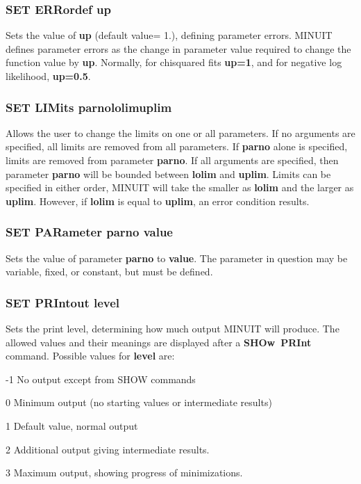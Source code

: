 \subsubsection*{SET ERRordef  up}

Sets the value of {\bf up} (default value= 1.), defining parameter errors.
MINUIT defines parameter errors as the change in parameter value
required to change the function value by {\bf up}.
Normally, for chisquared fits {\bf up=1},
and for negative log likelihood, {\bf up=0.5}.

\subsubsection*{SET LIMits  \lsb parno\rsb   \lsb lolim\rsb   \lsb uplim\rsb }

Allows the user to change the limits on one or all parameters.
If no arguments are specified, all limits are removed from all parameters.
If {\bf \lsb parno\rsb } alone is specified,
limits are removed from parameter {\bf \lsb parno\rsb }.
If all arguments are specified, then parameter
{\bf \lsb parno\rsb } will be bounded
between {\bf \lsb lolim\rsb } and {\bf \lsb uplim\rsb }.
Limits can be specified in either order,
MINUIT will take the smaller as {\bf \lsb lolim\rsb }
and the larger as {\bf \lsb uplim\rsb }.
However, if {\bf \lsb lolim\rsb } is equal to
{\bf \lsb uplim\rsb }, an error condition results.

\subsubsection*{SET PARameter  parno  value}

Sets the value of parameter {\bf parno} to {\bf value}.
The parameter
in question may be variable, fixed, or constant, but must be defined.

\subsubsection*{SET PRIntout level}

Sets the print level, determining how much output
MINUIT will produce.
The allowed values and their meanings are displayed
after a {\bf SHOw~PRInt} command.
Possible values for {\bf level} are:
\begin{DLtt}{12}
\item[-1] No output except from SHOW commands
\item[0]  Minimum output (no starting values or intermediate results)
\item[1]  Default value, normal output
\item[2]  Additional output giving intermediate results.
\item[3]  Maximum output, showing progress of minimizations.
\end{DLtt}

